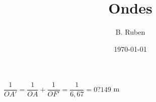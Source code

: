 \documentclass{article}
\begin{document}
\title{Ondes}
\author{B. Ruben}
\date{\today}

\maketitle

\section{}

$\dfrac{1}{OA'} = \dfrac{1}{OA} + \dfrac{1}{OF'} = \dfrac{1}{6,67} = 0?149$ m 
\end{document}
